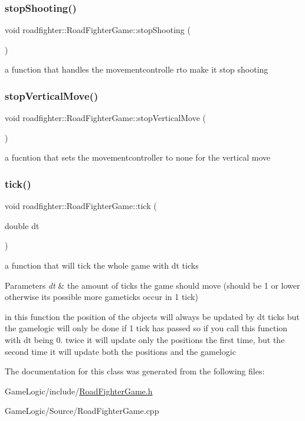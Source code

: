 \subsubsection{\texorpdfstring{stop\+Shooting()}{stopShooting()}}
{\footnotesize\ttfamily void roadfighter\+::\+Road\+Fighter\+Game\+::stop\+Shooting (\begin{DoxyParamCaption}{ }\end{DoxyParamCaption})}

a function that handles the movementcontrolle rto make it stop shooting \mbox{\label{classroadfighter_1_1RoadFighterGame_a032a6ec15e1752cae23559063e35d3cd}} 
\subsubsection{\texorpdfstring{stop\+Vertical\+Move()}{stopVerticalMove()}}
{\footnotesize\ttfamily void roadfighter\+::\+Road\+Fighter\+Game\+::stop\+Vertical\+Move (\begin{DoxyParamCaption}{ }\end{DoxyParamCaption})}

a fucntion that sets the movementcontroller to none for the vertical move \mbox{\label{classroadfighter_1_1RoadFighterGame_a1bbb706a128d1f98e06ea5e0f6ab1581}} 
\subsubsection{\texorpdfstring{tick()}{tick()}}
{\footnotesize\ttfamily void roadfighter\+::\+Road\+Fighter\+Game\+::tick (\begin{DoxyParamCaption}\item[{double}]{dt }\end{DoxyParamCaption})}

a function that will tick the whole game with dt ticks 
\begin{DoxyParams}{Parameters}
{\em dt} & the amount of ticks the game should move (should be 1 or lower otherwise it\textquotesingle{}s possible more gameticks occur in 1 tick)\\
\hline
\end{DoxyParams}
in this function the position of the objects will always be updated by dt ticks but the gamelogic will only be done if 1 tick has passed so if you call this function with dt being 0. twice it will update only the positions the first time, but the second time it will update both the positions and the gamelogic 

The documentation for this class was generated from the following files\+:\begin{DoxyCompactItemize}
\item 
Game\+Logic/include/\hyperlink{RoadFighterGame_8h}{Road\+Fighter\+Game.\+h}\item 
Game\+Logic/\+Source/Road\+Fighter\+Game.\+cpp\end{DoxyCompactItemize}
